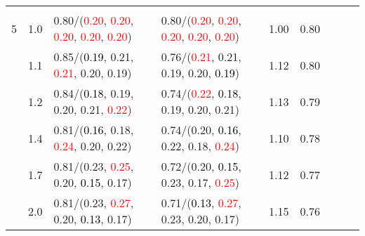 \documentclass[10pt,a4paper]{report}
\begin{document}
\begin{table}[!htbp]
\begin{center}
{\begin{tabular}{ccllccccc}
				  &                                   &                                                                                                                                                 &                                                                                                                                                 &                                             \\
				5 & 1.0                               & 0.80/(\textcolor{red}{0.20}, \textcolor{red}{0.20}, \textcolor{red}{0.20}, \textcolor{red}{0.20}, \textcolor{red}{0.20})                        & 0.80/(\textcolor{red}{0.20}, \textcolor{red}{0.20}, \textcolor{red}{0.20}, \textcolor{red}{0.20}, \textcolor{red}{0.20})                        & 1.00             & 0.80                     \\
				  & 1.1                               & 0.85/(\textcolor{black}{0.19}, 0.21, \textcolor{red}{0.21}, 0.20, 0.19)                                                                         & 0.76/(\textcolor{red}{0.21}, 0.21, 0.19, 0.20, \textcolor{black}{0.19})                                                                         & 1.12             & 0.80                     \\
				  & 1.2                               & 0.84/(\textcolor{black}{0.18}, 0.19, 0.20, 0.21, \textcolor{red}{0.22})                                                                         & 0.74/(\textcolor{red}{0.22}, \textcolor{black}{0.18}, 0.19, 0.20, 0.21)                                                                         & 1.13             & 0.79                     \\
				  & 1.4                               & 0.81/(\textcolor{black}{0.16}, 0.18, \textcolor{red}{0.24}, 0.20, 0.22)                                                                         & 0.74/(0.20, \textcolor{black}{0.16}, 0.22, 0.18, \textcolor{red}{0.24})                                                                         & 1.10             & 0.78                     \\
				  & 1.7                               & 0.81/(0.23, \textcolor{red}{0.25}, 0.20, \textcolor{black}{0.15}, 0.17)                                                                         & 0.72/(0.20, \textcolor{black}{0.15}, 0.23, 0.17, \textcolor{red}{0.25})                                                                         & 1.12             & 0.77                     \\
				  & 2.0                               & 0.81/(0.23, \textcolor{red}{0.27}, 0.20, \textcolor{black}{0.13}, 0.17)                                                                         & 0.71/(\textcolor{black}{0.13}, \textcolor{red}{0.27}, 0.23, 0.20, 0.17)                                                                         & 1.15             & 0.76                     \\

\end{tabular}}
\end{center}
\end{table}
\end{document}
